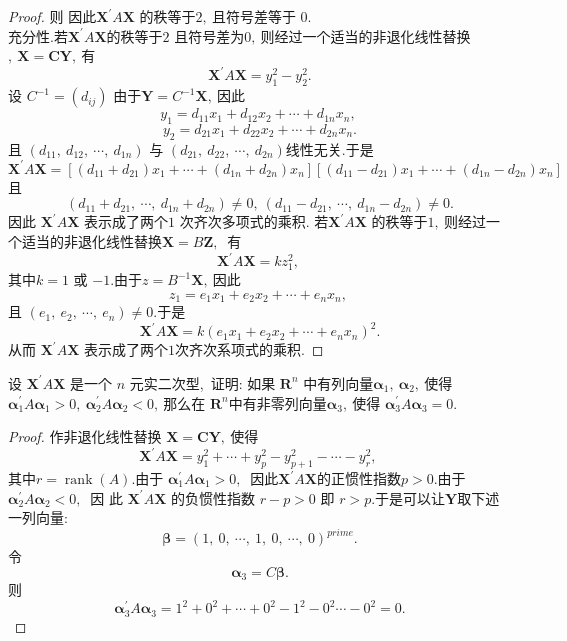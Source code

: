 \begin{proof}
	则
	因此$  \boldsymbol{X}^{\prime} A \boldsymbol{X} $ 的秩等于$ 2 ,\  $且符号差等于 $0.$\\
	充分性.若$\boldsymbol{X}^{\prime} A \boldsymbol{X} $的秩等于$ 2$ 且符号差为$ 0,\  $则经过一个适当的非退化线性替换$,\ \boldsymbol{X}=\boldsymbol{C} \boldsymbol{Y} ,\  $有
	$$\boldsymbol{X}^{\prime} A \boldsymbol{X}=y_{1}^{2}-y_{2}^{2} . $$
	设 $ C^{-1}=\left(d_{i j}\right) $ 由于$ \boldsymbol{Y}=C^{-1} \boldsymbol{X},\ $因此
	$$y_{1}=d_{11} x_{1}+d_{12} x_{2}+\cdots+d_{1 n} x_{n},\  $$
	$$y_{2}=d_{21} x_{1}+d_{22} x_{2}+\cdots+d_{2 n} x_{n} .$$
	且  $\left(d_{11},\  d_{12},\  \cdots,\  d_{1 n}\right) $ 与 $ \left(d_{21},\  d_{22},\  \cdots,\  d_{2 n}\right)  $线性无关.于是
	$$\boldsymbol{X}^{\prime} A \boldsymbol{X}=\left[\left(d_{11}+d_{21}\right) x_{1}+\cdots+\left(d_{1 n}+d_{2 n}\right) x_{n}\right]\left[\left(d_{11}-d_{21}\right) x_{1}+\cdots+\left(d_{1 n}-d_{2 n}\right) x_{n}\right] $$
	且 
	$$\left(d_{11}+d_{21},\  \cdots,\  d_{1 n}+d_{2 n}\right) \neq 0,\ \left(d_{11}-d_{21},\  \cdots,\  d_{1 n}-d_{2 n}\right) \neq 0 .$$
	因此 $ \boldsymbol{X}^{\prime} A \boldsymbol{X} $ 表示成了两个$ 1$ 次齐次多项式的乘积.
	若$  \boldsymbol{X}^{\prime} A \boldsymbol{X} $ 的秩等于$ 1,\  $则经过一个适当的非退化线性替换$  \boldsymbol{X}=B \boldsymbol{Z} ,\ $ 有
	$$\boldsymbol{X}^{\prime} A \boldsymbol{X}=k z_{1}^{2},\ $$
	其中$  k=1 $ 或 $ -1.$由于$  z=B^{-1} \boldsymbol{X} ,\  $因此
	$$ z_{1}=e_{1} x_{1}+e_{2} x_{2}+\cdots+e_{n} x_{n} ,\ $$
	且 $ \left(e_{1},\  e_{2},\  \cdots,\  e_{n}\right) \neq 0  .$于是
	$$\boldsymbol{X}^{\prime} A \boldsymbol{X}=k\left(e_{1} x_{1}+e_{2} x_{2}+\cdots+e_{n} x_{n}\right)^{2} .$$
	从而 $ \boldsymbol{X}^{\prime} A \boldsymbol{X}$  表示成了两个$ 1 $次齐次系项式的乘积.
\end{proof}
\newpage
\begin{problem}
	设 $ \boldsymbol{X}^{\prime} A \boldsymbol{X} $ 是一个  $n $ 元实二次型,\  证明: 如果 $ \mathbf{R}^{n} $ 中有列向量$  \boldsymbol{\alpha}_{1},\  \boldsymbol{\alpha}_{2} ,\  $使得  $\boldsymbol{\alpha}_{1}^{\prime} A \boldsymbol{\alpha}_{1}>0 ,\   \boldsymbol{\alpha}_{2}^{\prime} A \boldsymbol{\alpha}_{2}<0 ,\  $那么在 $ \mathbf{R}^{n}  中有非零列向量  \boldsymbol{\alpha}_{3} ,\  $使得  $\boldsymbol{\alpha}_{3}^{\prime} A \boldsymbol{\alpha}_{3}=0  .$
\end{problem}
\begin{proof}
	作非退化线性替换 $ \boldsymbol{X}=\boldsymbol{C Y} ,\ $使得
	$$\boldsymbol{X}^{\prime} A \boldsymbol{X}=y_{1}^{2}+\cdots+y_{p}^{2}-y_{p+1}^{2}-\cdots-y_{r}^{2},\ $$
	其中$  r=\operatorname{rank}(A).$由于  $\boldsymbol{\alpha}_{1}^{\prime} A \boldsymbol{\alpha}_{1}>0 ,\ $ 因此$  \boldsymbol{X}^{\prime} A \boldsymbol{X}  $的正惯性指数$  p>0  .$由于$  \boldsymbol{\alpha}_{2}^{\prime} A \boldsymbol{\alpha}_{2}<0 ,\ $ 因 此 $ \boldsymbol{X}^{\prime} A \boldsymbol{X} $ 的负惯性指数 $ r-p>0 $ 即  $r>p.$于是可以让$  \boldsymbol{Y}  $取下述一列向量:
	$$\boldsymbol{\beta}=\left(1,\ 0,\ \cdots,\ 1,\ 0,\ \cdots,\ 0\right)^{prime}.$$
	令
	$$\boldsymbol{\alpha}_3=C\boldsymbol{\beta}.$$
	则 $$ \boldsymbol{\alpha}_{3}^{\prime} A \boldsymbol{\alpha}_{3}=1^{2}+0^{2}+\cdots+0^{2}-1^{2}-0^{2} \cdots-0^{2}=0 .$$
\end{proof}
